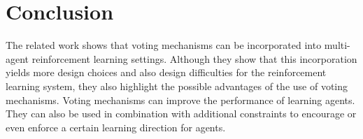 \documentclass[conference]{IEEEtran}
\begin{document}
\section{Conclusion}\label{4Conclusion}
The related work shows that voting mechanisms can be incorporated into multi-agent reinforcement learning settings. Although they show that this incorporation yields more design choices and also design difficulties for the reinforcement learning system, they also highlight the possible advantages of the use of voting mechanisms. Voting mechanisms can improve the performance of learning agents. They can also be used in combination with additional constraints to encourage or even enforce a certain learning direction for agents.




\vspace{12pt}
\end{document}
